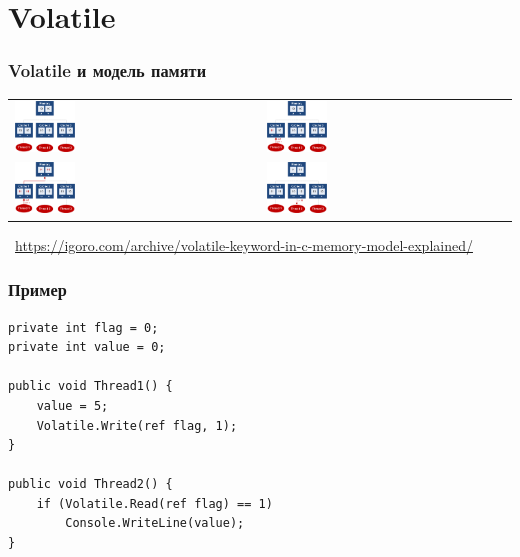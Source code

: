 \documentclass[xetex,mathserif,serif]{beamer}
\newcommand{\attribution}[1] {
\vspace{-5mm}\begin{flushright}\begin{scriptsize}\textcolor{gray}{\textcopyright\, #1}\end{scriptsize}\end{flushright}
}
\begin{document}
	\section{Volatile}

	\begin{frame}
		\frametitle{Volatile и модель памяти}
			\begin{center}
				\begin{tabu} {X[1 c p] X[1 c p]}
					\includegraphics[width=0.25\textwidth]{volatile1.png} & \includegraphics[width=0.25\textwidth]{volatile2.png} \\
					\includegraphics[width=0.25\textwidth]{volatile3.png} & \includegraphics[width=0.25\textwidth]{volatile4.png} \\
				\end{tabu}
				\attribution{\url{https://igoro.com/archive/volatile-keyword-in-c-memory-model-explained/}}
			\end{center}
	\end{frame}

	\begin{frame}[fragile]
		\frametitle{Пример}
		\begin{verbatim}
private int flag = 0;
private int value = 0;

public void Thread1() {
    value = 5;
    Volatile.Write(ref flag, 1);
}

public void Thread2() {
    if (Volatile.Read(ref flag) == 1)
        Console.WriteLine(value);
}
		\end{verbatim}
	\end{frame}
\end{document}
